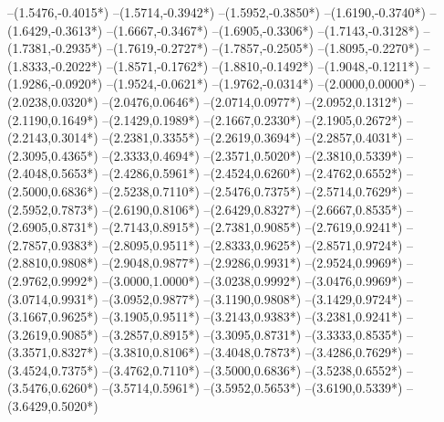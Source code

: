 {	--(1.5476,{-0.4015*\yskala})
	--(1.5714,{-0.3942*\yskala})
	--(1.5952,{-0.3850*\yskala})
	--(1.6190,{-0.3740*\yskala})
	--(1.6429,{-0.3613*\yskala})
	--(1.6667,{-0.3467*\yskala})
	--(1.6905,{-0.3306*\yskala})
	--(1.7143,{-0.3128*\yskala})
	--(1.7381,{-0.2935*\yskala})
	--(1.7619,{-0.2727*\yskala})
	--(1.7857,{-0.2505*\yskala})
	--(1.8095,{-0.2270*\yskala})
	--(1.8333,{-0.2022*\yskala})
	--(1.8571,{-0.1762*\yskala})
	--(1.8810,{-0.1492*\yskala})
	--(1.9048,{-0.1211*\yskala})
	--(1.9286,{-0.0920*\yskala})
	--(1.9524,{-0.0621*\yskala})
	--(1.9762,{-0.0314*\yskala})
	--(2.0000,{0.0000*\yskala})
	--(2.0238,{0.0320*\yskala})
	--(2.0476,{0.0646*\yskala})
	--(2.0714,{0.0977*\yskala})
	--(2.0952,{0.1312*\yskala})
	--(2.1190,{0.1649*\yskala})
	--(2.1429,{0.1989*\yskala})
	--(2.1667,{0.2330*\yskala})
	--(2.1905,{0.2672*\yskala})
	--(2.2143,{0.3014*\yskala})
	--(2.2381,{0.3355*\yskala})
	--(2.2619,{0.3694*\yskala})
	--(2.2857,{0.4031*\yskala})
	--(2.3095,{0.4365*\yskala})
	--(2.3333,{0.4694*\yskala})
	--(2.3571,{0.5020*\yskala})
	--(2.3810,{0.5339*\yskala})
	--(2.4048,{0.5653*\yskala})
	--(2.4286,{0.5961*\yskala})
	--(2.4524,{0.6260*\yskala})
	--(2.4762,{0.6552*\yskala})
	--(2.5000,{0.6836*\yskala})
	--(2.5238,{0.7110*\yskala})
	--(2.5476,{0.7375*\yskala})
	--(2.5714,{0.7629*\yskala})
	--(2.5952,{0.7873*\yskala})
	--(2.6190,{0.8106*\yskala})
	--(2.6429,{0.8327*\yskala})
	--(2.6667,{0.8535*\yskala})
	--(2.6905,{0.8731*\yskala})
	--(2.7143,{0.8915*\yskala})
	--(2.7381,{0.9085*\yskala})
	--(2.7619,{0.9241*\yskala})
	--(2.7857,{0.9383*\yskala})
	--(2.8095,{0.9511*\yskala})
	--(2.8333,{0.9625*\yskala})
	--(2.8571,{0.9724*\yskala})
	--(2.8810,{0.9808*\yskala})
	--(2.9048,{0.9877*\yskala})
	--(2.9286,{0.9931*\yskala})
	--(2.9524,{0.9969*\yskala})
	--(2.9762,{0.9992*\yskala})
	--(3.0000,{1.0000*\yskala})
	--(3.0238,{0.9992*\yskala})
	--(3.0476,{0.9969*\yskala})
	--(3.0714,{0.9931*\yskala})
	--(3.0952,{0.9877*\yskala})
	--(3.1190,{0.9808*\yskala})
	--(3.1429,{0.9724*\yskala})
	--(3.1667,{0.9625*\yskala})
	--(3.1905,{0.9511*\yskala})
	--(3.2143,{0.9383*\yskala})
	--(3.2381,{0.9241*\yskala})
	--(3.2619,{0.9085*\yskala})
	--(3.2857,{0.8915*\yskala})
	--(3.3095,{0.8731*\yskala})
	--(3.3333,{0.8535*\yskala})
	--(3.3571,{0.8327*\yskala})
	--(3.3810,{0.8106*\yskala})
	--(3.4048,{0.7873*\yskala})
	--(3.4286,{0.7629*\yskala})
	--(3.4524,{0.7375*\yskala})
	--(3.4762,{0.7110*\yskala})
	--(3.5000,{0.6836*\yskala})
	--(3.5238,{0.6552*\yskala})
	--(3.5476,{0.6260*\yskala})
	--(3.5714,{0.5961*\yskala})
	--(3.5952,{0.5653*\yskala})
	--(3.6190,{0.5339*\yskala})
	--(3.6429,{0.5020*\yskala})
}
